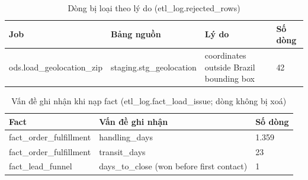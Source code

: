 \begin{table}[htbp]\centering\scriptsize\caption{Dòng bị loại theo lý do (etl\_log.rejected\_rows)}\label{tab:etl-rejected}
\begin{tabular}{p{3.67cm}p{3.67cm}p{5.04cm}p{1.65cm}}\toprule
\textbf{Job} & \textbf{Bảng nguồn} & \textbf{Lý do} & \textbf{Số dòng}\\\midrule
ods.load\_geolocation\_zip & staging.stg\_geolocation & coordinates outside Brazil bounding box & 42\\
\bottomrule\end{tabular}\end{table}

\begin{table}[htbp]\centering\scriptsize\caption{Vấn đề ghi nhận khi nạp fact (etl\_log.fact\_load\_issue; dòng không bị xoá)}\label{tab:etl-issues}
\begin{tabular}{p{3.53cm}p{8.89cm}p{2.02cm}}\toprule
\textbf{Fact} & \textbf{Vấn đề ghi nhận} & \textbf{Số dòng}\\\midrule
fact\_order\_fulfillment & handling\_days & 1.359\\
fact\_order\_fulfillment & transit\_days & 23\\
fact\_lead\_funnel & days\_to\_close (won before first contact) & 1\\
\bottomrule\end{tabular}\end{table}
